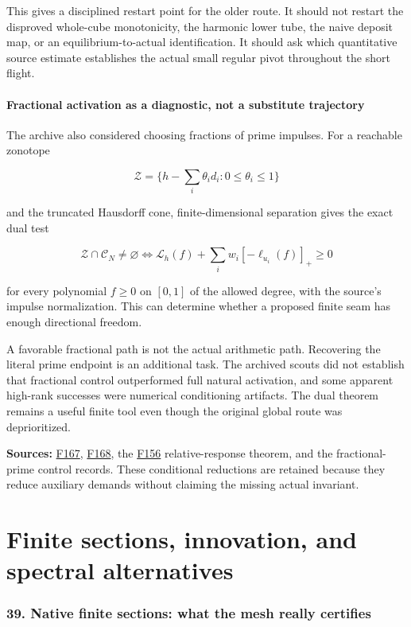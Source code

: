\documentclass[
  10pt,
  a4paper,
  10pt,
  oneside,
  openany]{book}
\begin{document}
This gives a disciplined restart point for the older route. It should
not restart the disproved whole-cube monotonicity, the harmonic lower
tube, the naive deposit map, or an equilibrium-to-actual identification.
It should ask which quantitative source estimate establishes the actual
small regular pivot throughout the short flight.

\subsection{Fractional activation as a diagnostic, not a substitute
trajectory}\label{fractional-activation-as-a-diagnostic-not-a-substitute-trajectory}

The archive also considered choosing fractions of prime impulses. For a
reachable zonotope

\[
 \mathcal Z=\{h-\sum_i\theta_id_i:0\le\theta_i\le1\}
\]

and the truncated Hausdorff cone, finite-dimensional separation gives
the exact dual test

\[
 \mathcal Z\cap\mathcal C_N\ne\varnothing
 \iff
 \mathcal L_h(f)+\sum_iw_i[-\ell_{u_i}(f)]_+\ge0
\]

for every polynomial \(f\ge0\) on \([0,1]\) of the allowed degree, with
the source's impulse normalization. This can determine whether a
proposed finite seam has enough directional freedom.

A favorable fractional path is not the actual arithmetic path.
Recovering the literal prime endpoint is an additional task. The
archived scouts did not establish that fractional control outperformed
full natural activation, and some apparent high-rank successes were
numerical conditioning artifacts. The dual theorem remains a useful
finite tool even though the original global route was deprioritized.

\textbf{Sources:} \hyperref[source-f167]{F167},
\hyperref[source-f168]{F168}, the \hyperref[source-f156]{F156}
relative-response theorem, and the fractional-prime control records.
These conditional reductions are retained because they reduce auxiliary
demands without claiming the missing actual invariant.

\part{Finite sections, innovation, and spectral alternatives}

\section{39. Native finite sections: what the mesh really
certifies}\label{ch-native}
\end{document}
